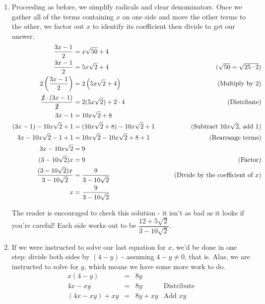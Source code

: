 \begin{ex}
\begin{enumerate}
\item  Proceeding as before, we simplify radicals and clear denominators.  Once we gather all of the terms containing $x$ on one side and move the other terms to the other, we factor out $x$ to identify its coefficient then divide to get our answer.
\begin{align*}
\dfrac{3x-1}{2} & = x\sqrt{50} + 4 \\
\dfrac{3x-1}{2} & = 5x\sqrt{2} + 4 & \tag{$\sqrt{50} = \sqrt{25 \cdot 2}$} \\
2\left(\dfrac{3x-1}{2}\right) & = 2 \left(5x\sqrt{2} + 4 \right) & \tag{Multiply by $2$} \\
\dfrac{\cancel{2} \cdot (3x-1)}{\cancel{2}} & = 2 (5x \sqrt{2}) + 2\cdot 4 & \tag{Distribute} \\ 
3x - 1 & = 10x \sqrt{2} + 8 \\
(3x-1) - 10x\sqrt{2} + 1 & = (10x \sqrt{2} + 8) - 10x\sqrt{2} + 1 & \tag{Subtract $10x\sqrt{2}$,  add $1$} \\
3x - 10x\sqrt{2} - 1 + 1 & = 10x\sqrt{2} - 10x\sqrt{2} + 8 + 1 & \tag{Rearrange terms} \\
3x - 10x\sqrt{2} & = 9 \\
(3 - 10\sqrt{2}) x & = 9 & \tag{Factor} \\
\dfrac{(3 - 10\sqrt{2}) x}{3 - 10\sqrt{2}} & = \dfrac{9}{3 - 10\sqrt{2}} & \tag{Divide by the coefficient of $x$} \\
x & = \dfrac{9}{3 - 10\sqrt{2}} \\
\end{align*} 

The reader is encouraged to check this solution - it isn't as bad as it looks if you're careful! Each side works out to be $\dfrac{12 + 5\sqrt{2}}{3-10\sqrt{2}}$.

\item  If we were instructed to solve our last equation for $x$, we'd be done in one step: divide both sides by $(4-y)$ - assuming $4-y \neq 0$, that is.  Alas, we are instructed to solve for $y$, which means we have some more work to do.\[ \begin{array}{rclr}

x(4-y) & = & 8y & \\

4x - xy & = & 8y & \text{Distribute} \\

(4x - xy) + xy & = & 8y + xy & \text{Add $xy$} \\


\end{array}\]
\end{enumerate}
\end{ex}
